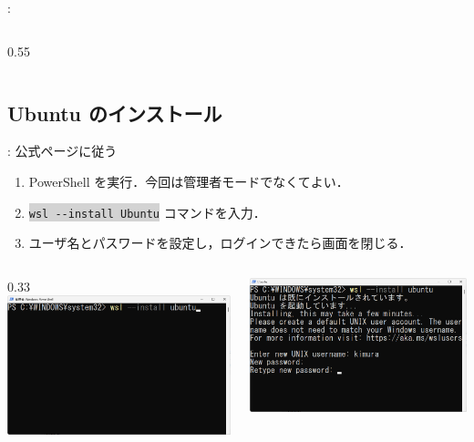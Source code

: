 \documentclass[aspectratio=169,dvipdfmx,cjk]{beamer}
\newcommand{\cmdline}[1]{
    \colorbox{lightgray}{\lstinline[style=command]{#1}}
}
\begin{document}
\begin{frame}{\insertsection \thesubsection: \insertsubsection}
\begin{columns}
\begin{column}{0.55\textwidth}
    \end{column}
  \end{columns}
\end{frame}

\subsection{Ubuntu のインストール}
\begin{frame}{\insertsection \thesubsection: \insertsubsection}
  公式ページ\cite{WSL}に従う
  \begin{enumerate}
    \item PowerShell を実行．今回は管理者モードでなくてよい．
    \item \cmdline{wsl --install Ubuntu} コマンドを入力．
    \item ユーザ名とパスワードを設定し，ログインできたら画面を閉じる．
  \end{enumerate}
  \vspace{5mm}
  \begin{columns}
    \begin{column}{0.33\textwidth}
        \includegraphics[width=1.0\linewidth]{fig/wsl-install-ubuntu.png}
    \end{column}
    \begin{column}{0.33\textwidth}
      \includegraphics[width=1.0\linewidth]{fig/ubuntu-set-user.png}

\end{column}
\end{columns}
\end{frame}
\end{document}
